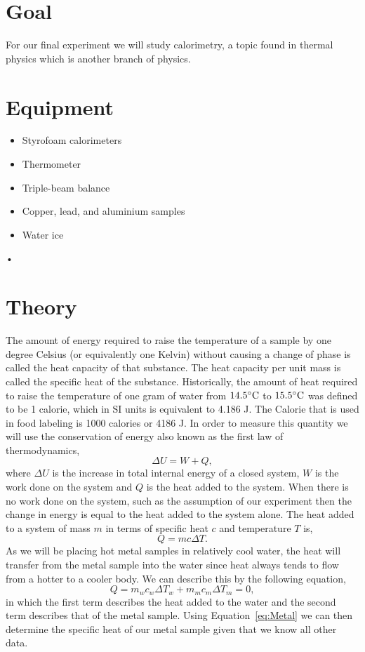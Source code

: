 \documentclass[main.tex]{subfiles}
\begin{document}
\section*{Goal}
For our final experiment we will study calorimetry, a topic found in thermal physics which is another branch of physics. 

\section*{Equipment}
\begin{itemize}
\item
Styrofoam calorimeters
\item
Thermometer
\item
Triple-beam balance
\item
Copper, lead, and aluminium samples
\item
Water ice
\end{itemize}•

\section*{Theory}
The amount of energy required to raise the temperature of a sample by one degree Celsius (or equivalently one Kelvin) without causing a change of phase is called the heat capacity of that substance. The heat capacity per unit mass is called the specific heat of the substance. Historically, the amount of heat required to raise the temperature of one gram of water from $14.5\celsius$ to $15.5\celsius$ was defined to be 1 calorie, which in SI units is equivalent to 4.186 J. The Calorie that is used in food labeling is 1000 calories or 4186 J. In order to measure this quantity we will use the conservation of energy also known as the first law of thermodynamics,
\begin{equation}
\Delta U=W+Q,
\end{equation}
where $\Delta U$ is the increase in total internal energy of a closed system, $W$ is the work done on the system and $Q$ is the heat added to the system. When there is no work done on the system, such as the assumption of our experiment then the change in energy is equal to the heat added to the system alone. The heat added to a system of mass $m$ in terms of specific heat $c$ and temperature $T$ is,
\begin{equation} \label{eq:Heat}
Q=mc\Delta T.
\end{equation}
As we will be placing hot metal samples in relatively cool water, the heat will transfer from the metal sample into the water since heat always tends to flow from a hotter to a cooler body. We can describe this by the following equation,
\begin{equation} \label{eq:Metal}
Q = m_{w}c_{w}\Delta T_{w}+m_{m}c_{m}\Delta T_{m}=0,
\end{equation}
in which the first term describes the heat added to the water and the second term describes that of the metal sample. Using Equation~\eqref{eq:Metal} we can then determine the specific heat of our metal sample given that we know all other data.
\end{document}
